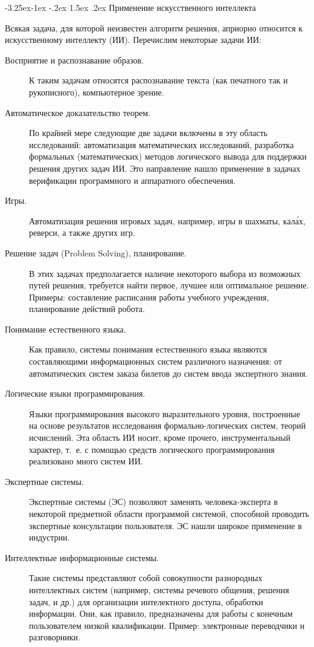 \documentclass[12pt, openany, twoside]{book} %
\makeatletter
\renewcommand\subsection{\@startsection{subsection}{2}{\z@}%
                                     {-3.25ex\@plus -1ex \@minus -.2ex}%
                                     {1.5ex \@plus .2ex}%
                                     {\normalfont\normalsize\bfseries}}
\makeatother
\begin{document}
\subsection{Применение искусственного интеллекта}

Всякая задача, для которой неизвестен алгоритм решения, априорно относится к искусственному интеллекту (ИИ). Перечислим некоторые задачи ИИ:
\begin{description}
 \item [Восприятие и распознавание образов.] К таким задачам относятся распознавание текста (как печатного так и рукописного), компьютерное зрение.
 \item [Автоматическое доказательство теорем.] По крайней мере следующие две задачи включены в эту область ис\-сле\-до\-ваний: автоматизация математических исследований, разработка формальных (математических) методов логического вывода для поддержки решения других задач ИИ. Это направление нашло применение в задачах верификации программного и аппаратного обеспечения.
 \item [Игры.] Автоматизация решения игровых задач, например, игры в шахматы, кал\'{а}х, реверси, а также других игр.
 \item [Решение задач (Problem Solving), планирование.] В этих задачах предполагается наличие некоторого выбора из возможных путей решения, требуется найти первое, лучшее или оптимальное решение. Примеры: составление расписания работы учебного учреждения, планирование действий робота.
 \item [Понимание естественного языка.] Как правило, си\-сте\-мы понимания естественного языка являются составляющими информационных систем различного назначения: от автоматических систем заказа билетов до систем ввода экспертного знания.
 \item [Логические языки программирования.] Языки программирования  высокого выразительного уровня, построенные на основе результатов исследования формально-ло\-ги\-чес\-ких систем, теорий исчислений. Эта область ИИ носит, кроме прочего, инструментальный характер, т.~е. с помощью средств логического программирования реализовано много систем ИИ.
 \item [Экспертные системы.] Экспертные системы  (ЭС) позволяют заменять человека-эксперта в некоторой предметной области программой системой, способной проводить экспертные консультации пользователя. ЭС нашли широкое применение в индустрии.
 \item [Интеллектные информационные системы.] Такие сис\-те\-мы представляют собой совокупности  разнородных интеллектных систем (например, системы речевого общения, решения задач, и др.) для организации интелектного доступа, обработки информации. Они, как правило, предназначены для работы с конечным пользователем низкой квалификации. Пример: электронные переводчики и разговорники.

\end{description}
\end{document}
